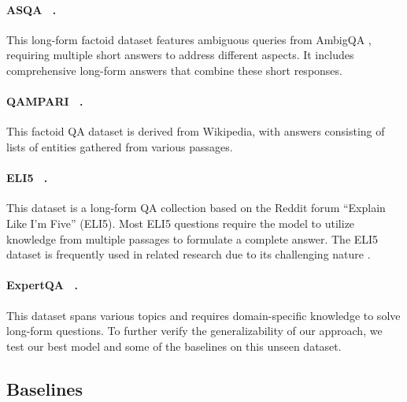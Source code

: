 \documentclass{article} %
\renewcommand{\cite}[1]{\citep{#1}}
\begin{document}
\paragraph{ASQA ~\cite{stelmakh2023asqafactoidquestionsmeet}.} This long-form factoid dataset features ambiguous queries from AmbigQA \cite{li2023survey}, requiring multiple short answers to address different aspects. It includes comprehensive long-form answers that combine these short responses. 

\paragraph{QAMPARI ~\cite{amouyal2023qampariopendomainquestionanswering}.} This factoid QA dataset is derived from Wikipedia, with answers consisting of lists of entities gathered from various passages. 

\paragraph{ELI5 ~\cite{fan2019eli5longformquestion}.} This dataset is a long-form QA collection based on the Reddit forum “Explain Like I’m Five” (ELI5). Most ELI5 questions require the model to utilize knowledge from multiple passages to formulate a complete answer. The ELI5 dataset is frequently used in related research due to its challenging nature \cite{nakano2021webgpt, menick2022teaching, jiang2023active}.


\paragraph{ExpertQA ~\cite{malaviya2024expertqaexpertcuratedquestionsattributed}.} This dataset spans various topics and requires domain-specific knowledge to solve long-form questions. To further verify the generalizability of our approach, we test our best model and some of the baselines on this unseen dataset.


\subsection{Baselines}
\label{sec:appbase}
\end{document}
